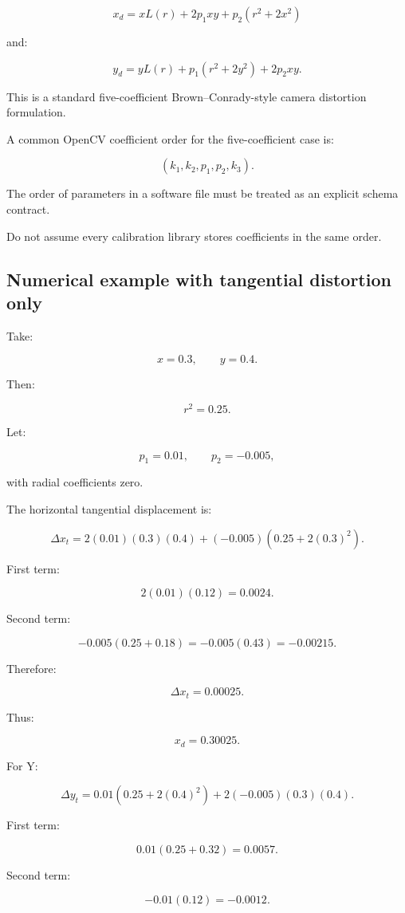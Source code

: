 \[
 \boxed{ x_d= xL(r)+2p_1xy+p_2(r^2+2x^2) }
\]

and:

\[
 \boxed{ y_d= yL(r)+p_1(r^2+2y^2)+2p_2xy }.
\]

This is a standard five-coefficient Brown--Conrady-style camera distortion formulation.

A common OpenCV coefficient order for the five-coefficient case is:

\[
 \boxed{ (k_1,k_2,p_1,p_2,k_3) }.
\]

The order of parameters in a software file must be treated as an explicit schema contract.

Do not assume every calibration library stores coefficients in the same order.

\subsection{Numerical example with tangential distortion only}\label{02-foundations-ii-ch035-numerical-example-with-tangential-distortion-only}

Take:

\[
 x=0.3,\qquad y=0.4.
\]

Then:

\[
 r^2=0.25.
\]

Let:

\[
 p_1=0.01,\qquad p_2=-0.005,
\]

with radial coefficients zero.

The horizontal tangential displacement is:

\[
 \Delta x_t= 2(0.01)(0.3)(0.4) +(-0.005)(0.25+2(0.3)^2).
\]

First term:

\[
 2(0.01)(0.12)=0.0024.
\]

Second term:

\[
 -0.005(0.25+0.18) =-0.005(0.43) =-0.00215.
\]

Therefore:

\[
 \boxed{ \Delta x_t=0.00025 }.
\]

Thus:

\[
 \boxed{x_d=0.30025}.
\]

For Y:

\[
 \Delta y_t= 0.01(0.25+2(0.4)^2) +2(-0.005)(0.3)(0.4).
\]

First term:

\[
 0.01(0.25+0.32)=0.0057.
\]

Second term:

\[
 -0.01(0.12)=-0.0012.
\]


